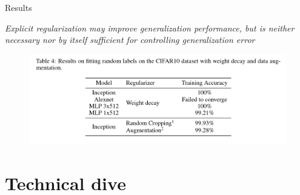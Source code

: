 \documentclass[10pt]{beamer}
\begin{document}
\begin{frame}{Results}
	\begin{center}
			\emph{Explicit regularization may improve generalization performance, but is neither necessary nor by itself sufficient for controlling generalization error}
	\end{center}

	\begin{figure}
		\centering
		\centering
		\includegraphics[width=\linewidth]{fig2c}
		\label{fig:withreg}
	\end{figure}
\end{frame}

\section{Technical dive}

\end{document}

